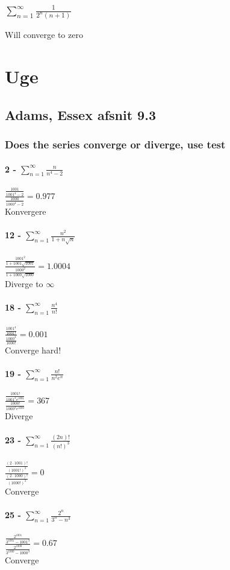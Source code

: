 \documentclass[12pt, a4paper]{report}
\begin{document}
			\subsection{$\sum\limits_{n=1}^{\infty}\frac{1}{2^n(n+1)}$}
				Will converge to zero
	\chapter{Uge}
		\section{Adams, Essex afsnit 9.3}
			\subsection{Does the series converge or diverge, use test}
				\setcounter{subsubsection}{1}
				\subsubsection{2 - $\sum\limits_{n=1}^{\infty}\frac{n}{n^4-2}$}
					$\frac{\frac{1001}{1001^4-2}}{\frac{1000}{1000^4-2}}=0.977$\\
					Konvergere
				\setcounter{subsubsection}{11}
				\subsubsection{12 - $\sum\limits_{n=1}^{\infty}\frac{n^2}{1+n\sqrt{n}}$}
					$\frac{\frac{1001^2}{1+1001\sqrt{1001}}}{\frac{1000^2}{1+1000\sqrt{1000}}}=1.0004$\\
					Diverge to $\infty$
				\setcounter{subsubsection}{17}
				\subsubsection{18 - $\sum\limits_{n=1}^{\infty}\frac{n^4}{n!}$}
					$\frac{\frac{1001^4}{1001!}}{\frac{1000^4}{1000!}}=0.001$\\
					Converge hard!			
				\subsubsection{19 - $\sum\limits_{n=1}^{\infty}\frac{n!}{n^2e^n}$}
					$\frac{\frac{1001!}{1001^2e^{1001}}}{\frac{1000!}{1000^2e^{1000}}}=367$\\
					Diverge
				\setcounter{subsubsection}{22}
				\subsubsection{23 - $\sum\limits_{n=1}^{\infty}\frac{(2n)!}{(n!)^3}$}
					$\frac{\frac{(2\cdot 1001)!}{(1001!)^3}}{\frac{(2\cdot 1000)!}{(1000!)^3}}=0$\\
					Converge
				\setcounter{subsubsection}{24}
				\subsubsection{25 - $\sum\limits_{n=1}^{\infty}\frac{2^n}{3^n-n^3}$}
					$\frac{\frac{2^{1001}}{3^{1001}-1001^3}}{\frac{2^{1000}}{3^{1000}-1000^3}}=0.67$\\
					Converge
\end{document}
